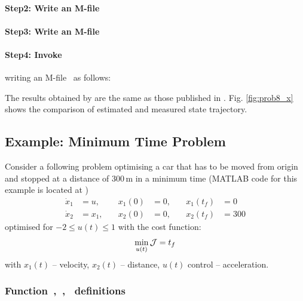 \paragraph{Step2: Write an M-file~}

{\small }

\paragraph{Step3: Write an M-file~}

{\small }

\paragraph{Step4: Invoke~} writing an
M-file~ as follows:

{\small }

The results obtained by  are the same as those published
in \cite{fik02}. Fig. \ref{fig:prob8_x} shows the comparison of
estimated and measured state trajectory. 

\subsection{Example: Minimum Time Problem}
\label{sec:car}

Consider a following problem optimising a car that has to be moved
from origin and stopped at a distance of 300\,m in a minimum time
(MATLAB code for this example is located at
)
\begin{align}
\dot{x}_1 &= u, \quad  &x_{1}(0) &= 0 , \quad  &x_{1}(t_f) &= 0 \\
\dot{x}_2 &= x_{1}, \quad &x_{2}(0) &= 0, \quad  &x_{2}(t_f) &= 300  
\end{align} 
optimised for $-2 \leq u(t) \leq 1$ with the cost function:
\begin{equation} \label{eq:car}
\min_{u(t)} \mathcal{J} = t_{f} 
\end{equation} 
with $x_1(t)$ -- velocity, $x_2(t)$ -- distance, $u(t)$ control --
acceleration.

\subsubsection{Function~,~,~  definitions}
\label{sec:car-fundef}


